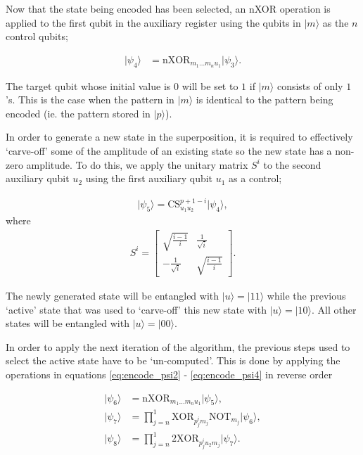 Now that the state being encoded has been selected, an \textrm{nXOR} operation is applied to the first qubit in the auxiliary register using the qubits in $\vert m \rangle$ as the $n$ control qubits;

\begin{align}
\label{eq:encode_psi4}
	\vert \psi_4 \rangle & =  \textrm{nXOR}_{m_1\dots m_n u_1}  \vert \psi_3 \rangle.
\end{align}

\noindent The target qubit whose initial value is $0$ will be set to $1$ if $\vert m \rangle$ consists of only $1$'s. This is the case when the pattern in $\vert m \rangle$ is identical to the pattern being encoded (ie. the pattern stored in $\vert p \rangle$).

In order to generate a new state in the superposition, it is required to effectively `carve-off' some of the amplitude of an existing state so the new state has a non-zero amplitude. To do this, we apply the unitary matrix $S^i$ to the second auxiliary qubit $u_2$ using the first auxiliary qubit $u_1$ as a control;

\begin{align}
\vert \psi_5 \rangle  =  \textrm{CS}_{u_1 u_2}^{p+1-i}  \vert \psi_4 \rangle,
\end{align}
\noindent where
\begin{align}
S^i = 
\begin{bmatrix}
\sqrt{\frac{i-1}{i}} & \frac{1}{\sqrt{i}} \\
-\frac{1}{\sqrt{i}}  & \sqrt{\frac{i-1}{i}}
\end{bmatrix}.
\end{align}

\noindent The newly generated state will be entangled with $\vert u\rangle = \vert 11 \rangle$ while the previous `active' state that was used to `carve-off' this new state with $\vert u\rangle = \vert 10 \rangle$. All other states will be entangled with $\vert u\rangle = \vert 00 \rangle$. 

In order to apply the next iteration of the algorithm, the previous steps used to select the active state have to be `un-computed'. This is done by applying the operations in equations \eqref{eq:encode_psi2} - \eqref{eq:encode_psi4} in reverse order

\begin{align}
	\vert \psi_6 \rangle & =  \textrm{nXOR}_{m_1\dots m_n u_1}  \vert \psi_5 \rangle    ,                               \\
	\vert \psi_7 \rangle & =  \prod\limits_{j=n}^{1} \textrm{XOR}_{p_j^i m_j} \textrm{NOT}_{m_j}  \vert \psi_6 \rangle, \\
	\vert \psi_8 \rangle & =  \prod\limits_{j=n}^{1} 2\textrm{XOR}_{p_j^i u_2 m_j} \vert \psi_7 \rangle.
\end{align}

